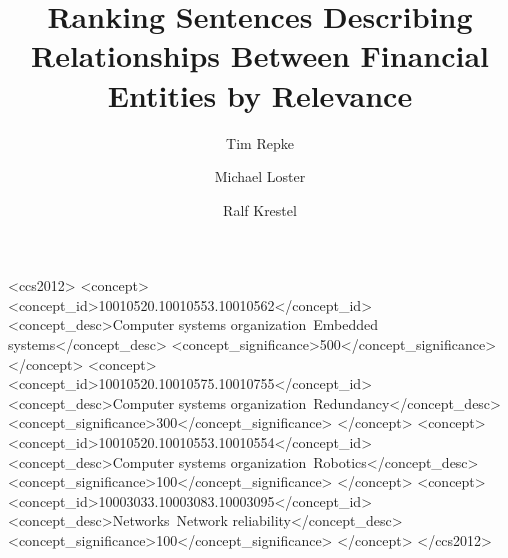 \documentclass[
	format=sigconf,
	review=false]{acmart}
\title{Ranking Sentences Describing Relationships Between Financial Entities by Relevance}
\author{Tim Repke}
\affiliation{%
	\institution{Hasso Plattner Institute}
	\city{Potsdam}
	\country{Germany}
}
\author{Michael Loster}
\affiliation{%
	\institution{Hasso Plattner Institute}
	\city{Potsdam}
	\country{Germany}
}
\author{Ralf Krestel}
\affiliation{%
	\institution{Hasso Plattner Institute}
	\city{Potsdam}
	\country{Germany}
}
\begin{document}

%
%
\begin{CCSXML}
<ccs2012>
 <concept>
  <concept_id>10010520.10010553.10010562</concept_id>
  <concept_desc>Computer systems organization~Embedded systems</concept_desc>
  <concept_significance>500</concept_significance>
 </concept>
 <concept>
  <concept_id>10010520.10010575.10010755</concept_id>
  <concept_desc>Computer systems organization~Redundancy</concept_desc>
  <concept_significance>300</concept_significance>
 </concept>
 <concept>
  <concept_id>10010520.10010553.10010554</concept_id>
  <concept_desc>Computer systems organization~Robotics</concept_desc>
  <concept_significance>100</concept_significance>
 </concept>
 <concept>
  <concept_id>10003033.10003083.10003095</concept_id>
  <concept_desc>Networks~Network reliability</concept_desc>
  <concept_significance>100</concept_significance>
 </concept>
</ccs2012>  
\end{CCSXML}





\maketitle




 
\end{document}
